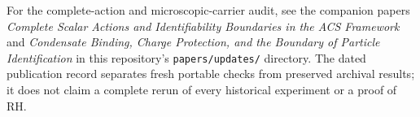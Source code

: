 \documentclass[11pt]{article}
\begin{document}
For the complete-action and microscopic-carrier audit, see the companion
papers \emph{Complete Scalar Actions and Identifiability Boundaries in the ACS
Framework} and \emph{Condensate Binding, Charge Protection, and the Boundary
of Particle Identification} in this repository's \texttt{papers/updates/}
directory. The dated publication record separates fresh portable checks
from preserved archival results; it does not claim a complete rerun of every
historical experiment or a proof of RH.
\end{document}
